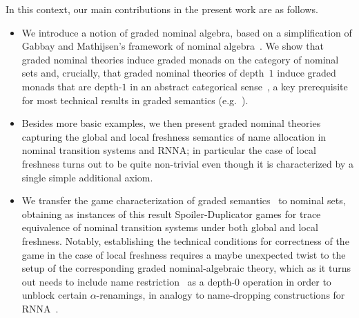 \documentclass[a4paper,UKenglish,cleveref,thm-restate,numberwithinsect,final]{lipics-v2021}
\theoremstyle{plain}
\numberwithin{equation}{section}
\newcommand{\+}[1]{\mathcal{#1}\xspace}
\theoremstyle{definition}
\begin{document}
In this context, our main contributions in the present work are as
follows.\vspace{-0.5em}
\begin{itemize}[wide]
\item We introduce a notion of graded nominal algebra, based on a
  simplification of Gabbay and Mathijsen's framework of nominal
  algebra~\cite{GabbayMathijssen09}. We show that graded nominal
  theories induce graded monads on the category of nominal sets and,
  crucially, that graded nominal theories of depth~$1$ induce graded
  monads that are depth-$1$ in an abstract categorical
  sense~\cite{MiliusEA15,DorschEA19}, a key prerequisite for most
  technical results in graded semantics
  (e.g.~\cite{MiliusEA15,DorschEA19,FordEA22,ForsterEA25b}).
\item Besides more basic examples, we then present graded nominal
  theories capturing the global and local freshness semantics of name
  allocation in nominal transition systems and RNNA; in particular
  the case of local freshness turns out to be quite non-trivial even
  though it is characterized by a single simple additional axiom.
\item We transfer the game characterization of graded
  semantics~\cite{FordEA22} to nominal sets, obtaining as instances of
  this result Spoiler-Duplicator games for trace equivalence of
  nominal transition systems under both global and local freshness.
  Notably, establishing the technical conditions
  for correctness of the game in the case of local freshness requires a
  maybe unexpected twist to the setup of the corresponding graded
  nominal-algebraic theory, which as it turns out needs to include name
  restriction~\cite{Pitts13} as a depth-$0$ operation in order to
  unblock certain $\alpha$-renamings, in analogy to name-dropping
  constructions for RNNA~\cite{SchroderEA17}.
\end{itemize}
\end{document}
